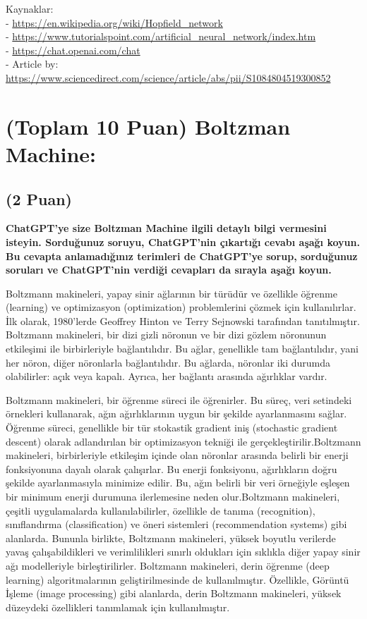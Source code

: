 \documentclass[11pt]{article}
\begin{document}
Kaynaklar:
\\ - \url{https://en.wikipedia.org/wiki/Hopfield\_network}
\\ - \url{https://www.tutorialspoint.com/artificial_neural_network/index.htm}
\\ - \url{https://chat.openai.com/chat}
\\ - Article by: \url{https://www.sciencedirect.com/science/article/abs/pii/S1084804519300852}

\section{(Toplam 10 Puan) Boltzman Machine:}

\subsection{(2 Puan)} \textbf{ChatGPT’ye size Boltzman Machine ilgili detaylı bilgi vermesini isteyin. Sorduğunuz soruyu, ChatGPT'nin çıkartığı cevabı aşağı koyun. Bu cevapta anlamadığınız terimleri de ChatGPT’ye sorup, sorduğunuz soruları ve ChatGPT’nin verdiği cevapları da sırayla aşağı koyun.}

Boltzmann makineleri, yapay sinir ağlarının bir türüdür ve özellikle öğrenme (learning) ve optimizasyon (optimization) problemlerini çözmek için kullanılırlar. İlk olarak, 1980'lerde Geoffrey Hinton ve Terry Sejnowski tarafından tanıtılmıştır.
Boltzmann makineleri, bir dizi gizli nöronun ve bir dizi gözlem nöronunun etkileşimi ile birbirleriyle bağlantılıdır. Bu ağlar, genellikle tam bağlantılıdır, yani her nöron, diğer nöronlarla bağlantılıdır. Bu ağlarda, nöronlar iki durumda olabilirler: açık veya kapalı. Ayrıca, her bağlantı arasında ağırlıklar vardır.

Boltzmann makineleri, bir öğrenme süreci ile öğrenirler. Bu süreç, veri setindeki örnekleri kullanarak, ağın ağırlıklarının uygun bir şekilde ayarlanmasını sağlar. Öğrenme süreci, genellikle bir tür stokastik gradient iniş (stochastic gradient descent) olarak adlandırılan bir optimizasyon tekniği ile gerçekleştirilir.Boltzmann makineleri, birbirleriyle etkileşim içinde olan nöronlar arasında belirli bir enerji fonksiyonuna dayalı olarak çalışırlar. Bu enerji fonksiyonu, ağırlıkların doğru şekilde ayarlanmasıyla minimize edilir. Bu, ağın belirli bir veri örneğiyle eşleşen bir minimum enerji durumuna ilerlemesine neden olur.Boltzmann makineleri, çeşitli uygulamalarda kullanılabilirler, özellikle de tanıma (recognition), sınıflandırma (classification) ve öneri sistemleri (recommendation systems) gibi alanlarda. Bununla birlikte, Boltzmann makineleri, yüksek boyutlu verilerde yavaş çalışabildikleri ve verimlilikleri sınırlı oldukları için sıklıkla diğer yapay sinir ağı modelleriyle birleştirilirler.
Boltzmann makineleri, derin öğrenme (deep learning) algoritmalarının geliştirilmesinde de kullanılmıştır. Özellikle, Görüntü İşleme (image processing) gibi alanlarda, derin Boltzmann makineleri, yüksek düzeydeki özellikleri tanımlamak için kullanılmıştır.
\end{document}
